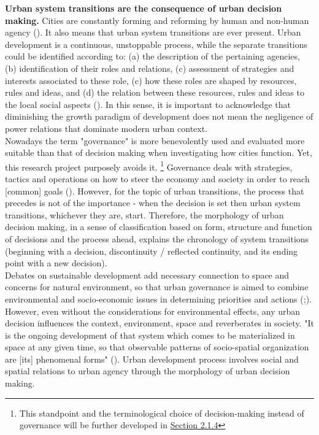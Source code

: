 \documentclass[11pt]{report}
\begin{document}
\textbf{Urban system transitions are the consequence of urban decision making.}
Cities are constantly forming and reforming by human and non-human agency (\href{Portugali}{\cite{PortugaliEtAl.2012}}).
It also means that urban system transitions are ever present.
Urban development is a continuous, unstoppable process, while the separate transitions could be identified according to:
(a) the description of the pertaining agencies, (b) identification of their roles and relations, (c) assessment of strategies and interests associated to these role,
(c) how these roles are shaped by resources, rules and ideas, and
(d) the relation between these resources, rules and ideas to the local social aspects (\href{Healey}{\citealt{healey_institutional_1992}}).
In this sense, it is important to acknowledge that diminishing the growth paradigm of development does not mean the negligence of power relations that dominate modern urban context. 
\\

Nowadays the term "governance" is more benevolently used and evaluated more suitable than that of decision making when investigating how cities function.
Yet, this research project purposely avoids it.
\footnote{This standpoint and the terminological choice of decision-making instead of governance will be further developed in \href{Section 2.1.4}{Section 2.1.4}} 
Governance deals with strategies, tactics and operations on how to steer the economy and society in order to reach [common] goals (\href{Pierre}{\citealt{pierre_governance_2000}}).
However, for the topic of urban transitions, the process that precedes is not of the importance - when the decision is set then urban system transitions, whichever they are, start.
Therefore, the morphology of urban decision making, in a sense of classification based on form, structure and function of decisions and the process ahead, explains the chronology of system transitions (beginning with a decision, discontinuity / reflected continuity, and its ending point with a new decision).
\\

Debates on sustainable development add necessary connection to space and concerns for natural environment, so that urban governance is aimed to combine environmental and socio-economic issues in determining priorities and actions (;\href{Hopwood}{\cite{HopwoodEtAl2005????}}).
However, even without the considerations for environmental effects, any urban decision influences the context, environment, space and reverberates in society.
"It is the ongoing development of that system which comes to be materialized in space at any given time, so that observable patterns of socio-spatial organization are [its] phenomenal forms" (\href{Gottdiener}{\citealt{gottdiener_social_2010}}).
Urban development process involves social and spatial relations to urban agency through the morphology of urban decision making.
\\
\end{document}
